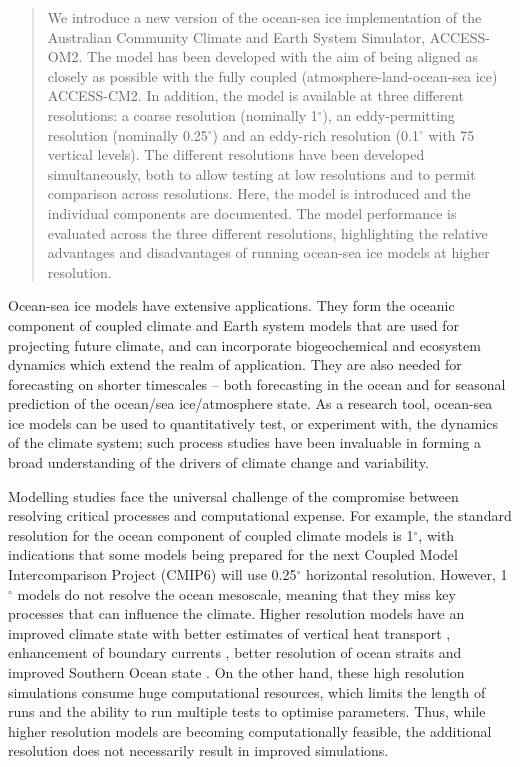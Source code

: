 \documentclass[gmd, manuscript]{copernicus}
\begin{document}
\begin{abstract}
We introduce a new version of the ocean-sea ice implementation of the Australian Community Climate and Earth System Simulator, ACCESS-OM2.
The model has been developed with the aim of being aligned as closely as possible with the fully coupled (atmosphere-land-ocean-sea ice) ACCESS-CM2.
In addition, the model is available at three different resolutions: a coarse resolution (nominally 1$^\circ$), an eddy-permitting resolution (nominally 0.25$^\circ$) and an eddy-rich resolution (0.1$^\circ$ with 75 vertical levels).
The different resolutions have been developed simultaneously, both to allow testing at low resolutions and to permit comparison across resolutions.
Here, the model is introduced and the individual components are documented. 
The model performance is evaluated across the three different resolutions, highlighting the relative advantages and disadvantages of running ocean-sea ice models at higher resolution.
\end{abstract}




\introduction  %

Ocean-sea ice models have extensive applications.
They form the oceanic component of coupled climate and Earth system models that are used for projecting future climate, and can incorporate biogeochemical and ecosystem dynamics which extend the realm of application.
They are also needed for forecasting on shorter timescales -- both forecasting in the ocean and for seasonal prediction of the ocean/sea ice/atmosphere state.
As a research tool, ocean-sea ice models can be used to quantitatively test, or experiment with, the dynamics of the climate system; such process studies have been invaluable in forming a broad understanding of the drivers of climate change and variability.

Modelling studies face the universal challenge of the compromise between resolving critical processes and computational expense.
For example, the standard resolution for the ocean component of coupled climate models is 1$^\circ$, with indications that some models being prepared for the next Coupled Model Intercomparison Project (CMIP6) will use 0.25$^\circ$ horizontal resolution.
However, 1$^\circ$ models do not resolve the ocean mesoscale, meaning that they miss key processes that can influence the climate. 
Higher resolution models have an improved climate state with better estimates of vertical heat transport \citep{Griffies2015}, enhancement of boundary currents \citep{Hewitt2016}, better resolution of ocean straits and improved Southern Ocean state \citep{Bishop2016}.
On the other hand, these high resolution simulations consume huge computational resources, which limits the length of runs and the ability to run multiple tests to optimise parameters.
Thus, while higher resolution models are becoming computationally feasible, the additional resolution does not necessarily result in improved simulations.
\end{document}
